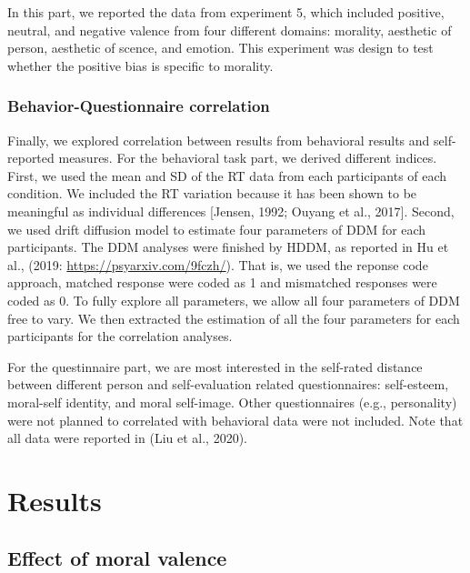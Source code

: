 \documentclass[man]{apa6}
\begin{document}
In this part, we reported the data from experiment 5, which included positive, neutral, and negative valence from four different domains: morality, aesthetic of person, aesthetic of scence, and emotion. This experiment was design to test whether the positive bias is specific to morality.

\hypertarget{behavior-questionnaire-correlation}{%
\subsubsection{Behavior-Questionnaire correlation}\label{behavior-questionnaire-correlation}}

Finally, we explored correlation between results from behavioral results and self-reported measures.
For the behavioral task part, we derived different indices. First, we used the mean and SD of the RT data from each participants of each condition. We included the RT variation because it has been shown to be meaningful as individual differences {[}Jensen, 1992; Ouyang et al., 2017{]}. Second, we used drift diffusion model to estimate four parameters of DDM for each participants.
The DDM analyses were finished by HDDM, as reported in Hu et al., (2019: \url{https://psyarxiv.com/9fczh/}). That is, we used the reponse code approach, matched response were coded as 1 and mismatched responses were coded as 0. To fully explore all parameters, we allow all four parameters of DDM free to vary. We then extracted the estimation of all the four parameters for each participants for the correlation analyses.

For the questinnaire part, we are most interested in the self-rated distance between different person and self-evaluation related questionnaires: self-esteem, moral-self identity, and moral self-image. Other questionnaires (e.g., personality) were not planned to correlated with behavioral data were not included. Note that all data were reported in (Liu et al., 2020).

\hypertarget{results}{%
\section{Results}\label{results}}

\hypertarget{effect-of-moral-valence}{%
\subsection{Effect of moral valence}\label{effect-of-moral-valence}}
\end{document}
